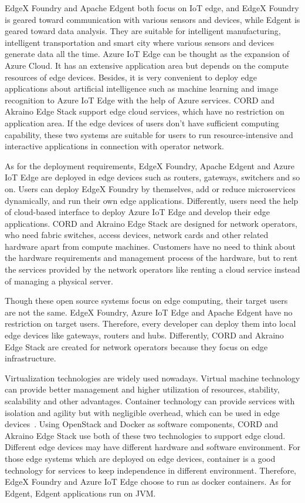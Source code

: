 EdgeX Foundry and Apache Edgent both focus on IoT edge, and EdgeX Foundry is geared toward communication with various sensors and devices, while Edgent is geared toward data analysis. They are suitable for intelligent manufacturing, intelligent transportation and smart city where various sensors and devices generate data all the time. Azure IoT Edge can be thought as the expansion of Azure Cloud. It has an extensive application area but depends on the compute resources of edge devices. Besides, it is very convenient to deploy edge applications about artificial intelligence such as machine learning and image recognition to Azure IoT Edge with the help of Azure services. CORD and Akraino Edge Stack support edge cloud services, which have no restriction on application area. If the edge devices of users don't have sufficient computing capability, these two systems are suitable for users to run resource-intensive and interactive applications in connection with operator network.

As for the deployment requirements, EdgeX Foundry, Apache Edgent and Azure IoT Edge are deployed in edge devices such as routers, gateways, switchers and so on. Users can deploy EdgeX Foundry by themselves, add or reduce microservices dynamically, and run their own edge applications. Differently, users need the help of cloud-based interface to deploy Azure IoT Edge and develop their edge applications. CORD and Akraino Edge Stack are designed for network operators, who need fabric switches, access devices, network cards and other related hardware apart from compute machines. Customers have no need to think about the hardware requirements and management process of the hardware, but to rent the services provided by the network operators like renting a cloud service instead of managing a physical server.

Though these open source systems focus on edge computing, their target users are not the same. EdgeX Foundry, Azure IoT Edge and Apache Edgent have no restriction on target users. Therefore, every developer can deploy them into local edge devices like gateways, routers and hubs. Differently, CORD and Akraino Edge Stack are created for network operators because they focus on edge infrastructure.

Virtualization technologies are widely used nowadays. Virtual machine technology can provide better management and higher utilization of resources, stability, scalability and other advantages. Container technology can provide services with isolation and agility but with negligible overhead, which can be used in edge devices~. Using OpenStack and Docker as software components, CORD and Akraino Edge Stack use both of these two technologies to support edge cloud. Different edge devices may have different hardware and software environment. For those edge systems which are deployed on edge devices, container is a good technology for services to keep independence in different environment. Therefore, EdgeX Foundry and Azure IoT Edge choose to run as docker containers. As for Edgent, Edgent applications run on JVM.

